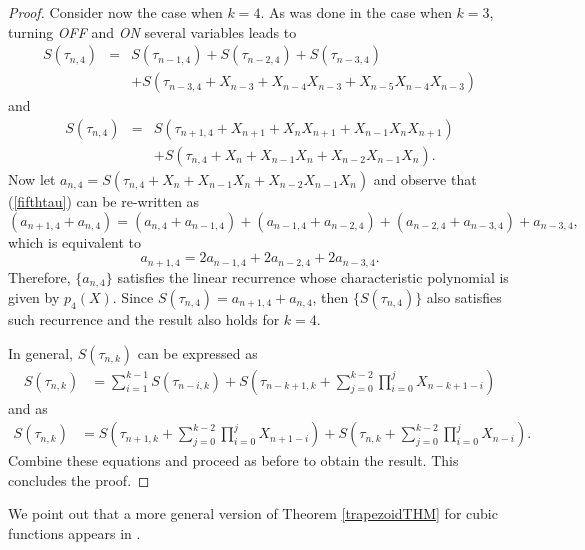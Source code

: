 \begin{proof}
Consider now the case when $k=4$.  As was done in the case when $k=3$,  turning {\it OFF} and {\it ON} several variables leads to 
\begin{eqnarray}
\label{fifthtau}
S(\tau_{n,4})&=&S(\tau_{n-1,4})+S(\tau_{n-2,4})+S(\tau_{n-3,4})\\\nonumber
&&+S(\tau_{n-3,4}+X_{n-3}+X_{n-4}X_{n-3}+X_{n-5}X_{n-4}X_{n-3})
\end{eqnarray}
and
\begin{eqnarray}
S(\tau_{n,4})&=& S(\tau_{n+1,4}+X_{n+1}+X_{n}X_{n+1}+X_{n-1}X_{n}X_{n+1})\\\nonumber
&&+S(\tau_{n,4}+X_{n}+X_{n-1}X_{n}+X_{n-2}X_{n-1}X_{n}).
\end{eqnarray}
Now let $a_{n,4}=S(\tau_{n,4}+X_{n}+X_{n-1}X_{n}+X_{n-2}X_{n-1}X_{n})$ and observe that (\ref{fifthtau}) can be re-written as
\begin{equation}
(a_{n+1,4}+a_{n,4})=(a_{n,4}+a_{n-1,4})+(a_{n-1,4}+a_{n-2,4})+(a_{n-2,4}+a_{n-3,4})+a_{n-3,4},
\end{equation}
which is equivalent to
\begin{equation}
a_{n+1,4} = 2a_{n-1,4}+2a_{n-2,4}+2a_{n-3,4}.
\end{equation}
Therefore, $\{a_{n,4}\}$ satisfies the linear recurrence whose characteristic polynomial is given by $p_4(X)$.  Since $S(\tau_{n,4})=a_{n+1,4}+a_{n,4}$, then $\{S(\tau_{n,4})\}$ also satisfies such 
recurrence and the result also holds for $k=4$.  

In general, $S(\tau_{n,k})$ can be expressed as
\begin{align}
S(\tau_{n,k})&=\sum_{i=1}^{k-1} S(\tau_{n-i,k})+S\left(\tau_{n-k+1,k}+\sum_{j=0}^{k-2} \prod_{i=0}^j X_{n-k+1-i}\right)
\end{align}
and as
\begin{align}
S(\tau_{n,k})&=S\left(\tau_{n+1,k}+\sum_{j=0}^{k-2} \prod_{i=0}^j X_{n+1-i}\right)+S\left(\tau_{n,k}+\sum_{j=0}^{k-2} \prod_{i=0}^j X_{n-i}\right).
\end{align}
Combine these equations and proceed as before to obtain the result.  This concludes the proof.
\end{proof}

\begin{remark}
We point out that a more general version of Theorem \ref{trapezoidTHM} for cubic functions appears in \cite{browncusick}.
\end{remark}

